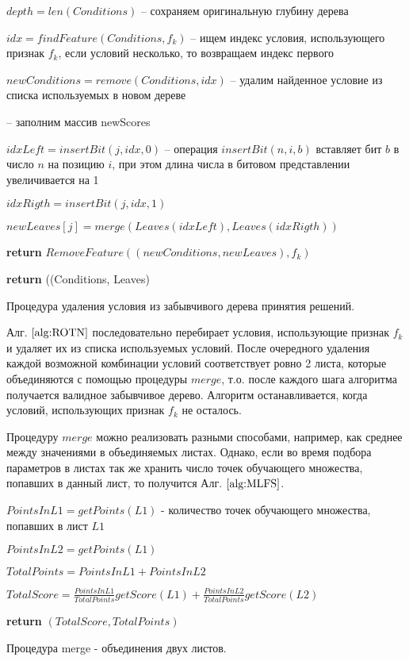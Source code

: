 \documentclass[12pt,a4paper]{report}
\begin{document}
\begin{algorithm}[H]
\SetAlgoLined
{}
$depth = len(Conditions)$ -- сохраняем оригинальную глубину дерева

$idx = findFeature(Conditions, f_k)$ -- ищем индекс условия, использующего признак $f_k$, если условий несколько, то возвращаем индекс первого

 {
	$newConditions = remove(Conditions, idx)$ -- удалим найденное условие из списка используемых в новом дереве
	
	 { -- заполним массив newScores
	
		$idxLeft = insertBit(j, idx, 0)$ -- операция $insertBit(n, i, b)$ вставляет бит $b$ в число $n$ на позицию $i$, при этом длина числа в битовом представлении увеличивается на 1
		
		$idxRigth = insertBit(j, idx, 1)$
		
		$newLeaves[j] = merge(Leaves(idxLeft), Leaves(idxRigth))$
		
		\textbf{return} $RemoveFeature((newConditions, newLeaves), f_k)$
	}
} {
	\textbf{return} ((Conditions, Leaves)
}
\caption{Процедура удаления условия из забывчивого дерева принятия решений.}
\label{alg:ROTN}
\end{algorithm}

Алг. $\ref{alg:ROTN}$ последовательно перебирает условия, использующие признак $f_k$ и удаляет их из списка используемых условий. После очередного удаления каждой возможной комбинации условий соответствует ровно 2 листа, которые объединяются с помощью процедуры $merge$, т.о. после каждого шага алгоритма получается валидное забывчивое дерево. Алгоритм останавливается, когда условий, использующих признак $f_k$ не осталось.

Процедуру $merge$ можно реализовать разными способами, например, как среднее между значениями в объединяемых листах. Однако, если во время подбора параметров в листах так же хранить число точек обучающего множества, попавших в данный лист, то получится Алг. $\ref{alg:MLFS}$.

\begin{algorithm}[H]
\SetAlgoLined
{}
$PointsInL1 = getPoints(L1)$ - количество точек обучающего множества, попавших в лист $L1$

$PointsInL2 = getPoints(L1)$

$TotalPoints = PointsInL1 + PointsInL2$

$TotalScore = \frac{PointsInL1}{TotalPoints}getScore(L1) + \frac{PointsInL2}{TotalPoints}getScore(L2)$

\textbf{return} $(TotalScore, TotalPoints)$
\caption{Процедура merge - объединения двух листов.}
\label{alg:MLFS}
\end{algorithm}
\end{document}
